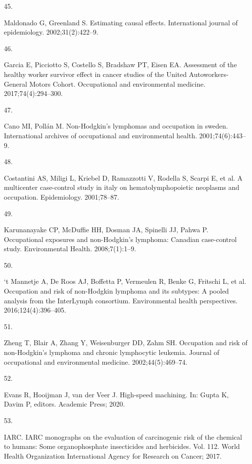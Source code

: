 \documentclass[
  11pt,
  letterpaper,
  DIV=11,
  numbers=noendperiod]{scrartcl}
\newlength{\cslhangindent}
\newlength{\csllabelwidth}
\newenvironment{CSLReferences}[2] %
 {\begin{list}{}{%
  \setlength{\itemindent}{0pt}
  \setlength{\leftmargin}{0pt}
  \setlength{\parsep}{0pt}
  \ifodd #1
   \setlength{\leftmargin}{\cslhangindent}
   \setlength{\itemindent}{-1\cslhangindent}
  \fi
  \setlength{\itemsep}{#2\baselineskip}}}
 {\end{list}}
\newcommand{\CSLLeftMargin}[1]{\parbox[t]{\csllabelwidth}{\strut#1\strut}}
\newcommand{\CSLRightInline}[1]{\parbox[t]{\linewidth - \csllabelwidth}{\strut#1\strut}}
\begin{document}
\begin{CSLReferences}{1}{0}
\CSLLeftMargin{45. }%
\CSLRightInline{Maldonado G, Greenland S. Estimating causal effects.
International journal of epidemiology. 2002;31(2):422--9. }

\CSLLeftMargin{46. }%
\CSLRightInline{Garcia E, Picciotto S, Costello S, Bradshaw PT, Eisen
EA. Assessment of the healthy worker survivor effect in cancer studies
of the {United Autoworkers-General Motors Cohort}. Occupational and
environmental medicine. 2017;74(4):294--300. }

\CSLLeftMargin{47. }%
\CSLRightInline{Cano MI, Pollán M. Non-{Hodgkin}'s lymphomas and
occupation in sweden. International archives of occupational and
environmental health. 2001;74(6):443--9. }

\CSLLeftMargin{48. }%
\CSLRightInline{Costantini AS, Miligi L, Kriebel D, Ramazzotti V,
Rodella S, Scarpi E, et al. A multicenter case-control study in italy on
hematolymphopoietic neoplasms and occupation. Epidemiology. 2001;78--87.
}

\CSLLeftMargin{49. }%
\CSLRightInline{Karunanayake CP, McDuffie HH, Dosman JA, Spinelli JJ,
Pahwa P. Occupational exposures and non-{Hodgkin}'s lymphoma: Canadian
case-control study. Environmental Health. 2008;7(1):1--9. }

\CSLLeftMargin{50. }%
\CSLRightInline{`t Mannetje A, De Roos AJ, Boffetta P, Vermeulen R,
Benke G, Fritschi L, et al. Occupation and risk of non-{Hodgkin}
lymphoma and its subtypes: A pooled analysis from the InterLymph
consortium. Environmental health perspectives. 2016;124(4):396--405. }

\CSLLeftMargin{51. }%
\CSLRightInline{Zheng T, Blair A, Zhang Y, Weisenburger DD, Zahm SH.
Occupation and risk of non-{Hodgkin}'s lymphoma and chronic lymphocytic
leukemia. Journal of occupational and environmental medicine.
2002;44(5):469--74. }

\CSLLeftMargin{52. }%
\CSLRightInline{Evans R, Hooijman J, van der Veer J. High-speed
machining. In: Gupta K, Davim P, editors. Academic Press; 2020. }

\CSLLeftMargin{53. }%
\CSLRightInline{IARC. IARC monographs on the evaluation of carcinogenic
risk of the chemical to humans: Some organophosphate insecticides and
herbicides. Vol. 112. World Health Organization International Agency for
Research on Cancer; 2017. }


\end{CSLReferences}
\end{document}
